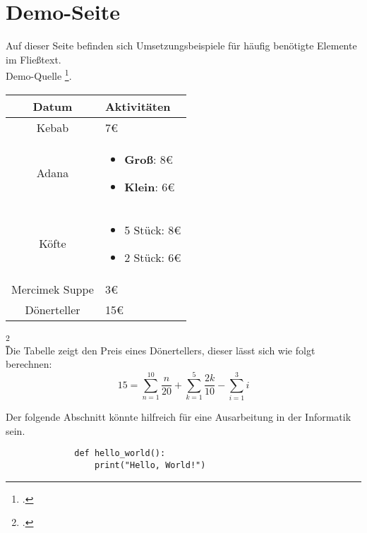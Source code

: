 \section{Demo-Seite}
Auf dieser Seite befinden sich Umsetzungsbeispiele für häufig benötigte Elemente im Fließtext.\\
Demo-Quelle \footcite[Vgl.][]{DemoQuelle}.

\begin{center}
    \begin{table}[h]
    \centering
    \begin{tabular}{|c|p{6cm}|}
        \hline
        \textbf{Datum} & \textbf{Aktivitäten} \\
        \hline
        Kebab & 7€ \\
        \hline
        Adana & \begin{itemize}
            \item \textbf{Groß}: 8€
            \item \textbf{Klein}: 6€
        \end{itemize} \\
        \hline
        Köfte & \begin{itemize}
            \item 5 Stück: 8€
            \item 2 Stück: 6€
        \end{itemize}\\
        \hline
        Mercimek Suppe & 3€ \\
        \hline
        Dönerteller & 15€ \\
        \hline
    \end{tabular}
    \label{tab:example}
    \end{table}
\end{center}
\footcitetext[Vgl.][]{DemoQuelle}\\ [-4em]

Die Tabelle zeigt den Preis eines Dönertellers, dieser lässt sich wie folgt berechnen:
\begin{equation}
    15 = \sum_{n=1}^{10} \frac{n}{20} + \sum_{k=1}^{5} \frac{2k}{10} - \sum_{i=1}^{3} i
\end{equation}

\newpage
Der folgende Abschnitt könnte hilfreich für eine Ausarbeitung in der Informatik sein.
\begin{figure}[h]
    \begin{lstlisting}
        def hello_world():
            print("Hello, World!")
    \end{lstlisting}
    \label{fig:meincode}
\end{figure}

